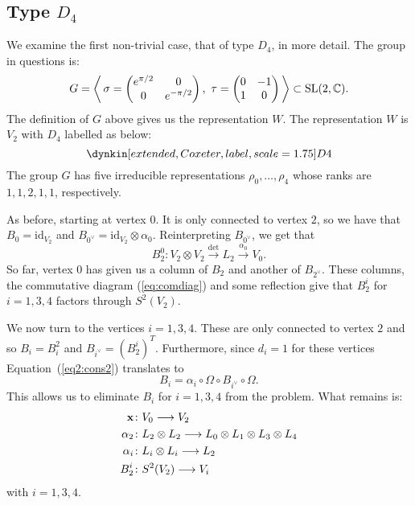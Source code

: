 \documentclass{amsart}
\theoremstyle{definition}
\begin{document}
\subsection{Type $D_4$}
We examine the first non-trivial case, that of type $D_4$, in more detail.
The group in questions is:
$$G= \left\langle \,\sigma=\begin{pmatrix} e^{\pi/2} & 0 \\ 0 & e^{-\pi/2} \end{pmatrix},\,\, \tau=\begin{pmatrix} 0 & -1 \\ 1 & 0 \end{pmatrix} \,\right\rangle \subset \operatorname{SL}(2, \mathbb{C}).$$
The definition of $G$ above gives us the representation $W$. The representation $W$ is $V_2$ with $D_4$ labelled as below:
\begin{equation*}
    \dynkin[extended,Coxeter,label,scale=1.75]D4{}
\end{equation*}
The group $G$ has five irreducible representations $\rho_0, \ldots, \rho_4$ whose ranks are $1,1,2,1,1$, respectively.

As before, starting at vertex $0$.
It is only connected to vertex $2$, so we have that $B_0=\text{id}_{V_2}$ and $B_{0^\vee} = \text{id}_{V_2} \otimes \alpha_0$.
Reinterpreting $B_{0^\vee}$, we get that 
$$B_2^0 \colon V_2 \otimes V_2 \xrightarrow{\det} L_2 \xrightarrow{\alpha_0} V_0.$$
So far, vertex $0$ has given us a column of $B_2$ and another of $B_{2^\vee}$.
These columns, the commutative diagram (\ref{eq:comdiag}) and some reflection give that $B_2^i$ for $i=1,3,4$ factors through $S^2(V_2)$.

We now turn to the vertices $i=1,3,4$.
These are only connected to vertex $2$ and so $B_i=B_i^2$ and $B_{i^\vee}= (B_2^i)^T$.
Furthermore, since $d_i=1$ for these vertices Equation~(\ref{eq2:cons2}) translates to $$B_i = \alpha_i \circ \Omega \circ B_{i^\vee} \circ \Omega.$$
This allows us to eliminate $B_i$ for $i=1,3,4$ from the problem.
What remains is:
\begin{align*}
    \mathbf{x} \colon &V_0 \longrightarrow V_2 \\
    \alpha_2 \colon & L_2 \otimes L_2 \longrightarrow L_0 \otimes L_1 \otimes L_3 \otimes L_4 \\
    \alpha_i \colon &L_i \otimes L_i \longrightarrow L_2 \\
    B_2^i \colon &S^2(V_2) \longrightarrow V_i 
\end{align*}
with $i=1,3,4$.
\end{document}
